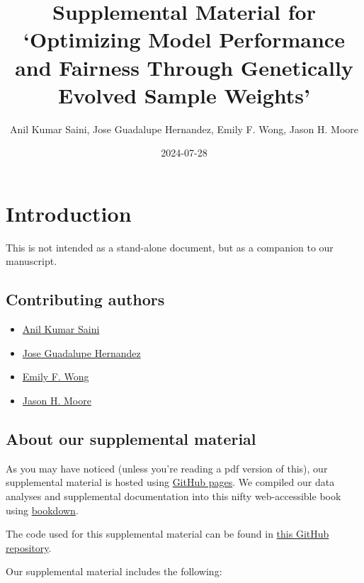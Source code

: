 \documentclass[
]{book}
\title{Supplemental Material for `Optimizing Model Performance and Fairness Through Genetically Evolved Sample Weights'}
\author{Anil Kumar Saini, Jose Guadalupe Hernandez, Emily F. Wong, Jason H. Moore}
\date{2024-07-28}
\providecommand{\tightlist}{%
  \setlength{\itemsep}{0pt}\setlength{\parskip}{0pt}}
\begin{document}
\maketitle

{
\setcounter{tocdepth}{1}
\tableofcontents
}
\hypertarget{introduction}{%
\chapter{Introduction}\label{introduction}}

This is not intended as a stand-alone document, but as a companion to our manuscript.

\hypertarget{contributing-authors}{%
\section{Contributing authors}\label{contributing-authors}}

\begin{itemize}
\tightlist
\item
  \href{https://theaksaini.github.io/}{Anil Kumar Saini}
\item
  \href{https://jgh9094.github.io/}{Jose Guadalupe Hernandez}
\item
  \href{https://www.cedars-sinai.edu/research-education/research/labs/bright/members.html}{Emily F. Wong}
\item
  \href{https://jasonhmoore.org/}{Jason H. Moore}
\end{itemize}

\hypertarget{about-our-supplemental-material}{%
\section{About our supplemental material}\label{about-our-supplemental-material}}

As you may have noticed (unless you're reading a pdf version of this), our supplemental material is hosted using \href{https://pages.github.com/}{GitHub pages}.
We compiled our data analyses and supplemental documentation into this nifty web-accessible book using \href{https://bookdown.org}{bookdown}.

The code used for this supplemental material can be found in \href{https://github.com/jgh9094/GPTP-2024-Lexicase-Analysis}{this GitHub repository}.

Our supplemental material includes the following:
\end{document}
